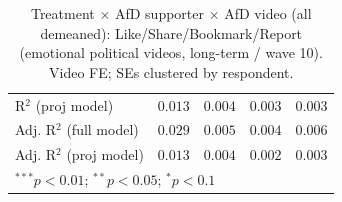\begin{table}
\begin{center}
\begin{tabular}{l c c c c}
R$^2$ (proj model)                               & $0.013$       & $0.004$       & $0.003$        & $0.003$        \\
Adj. R$^2$ (full model)                          & $0.029$       & $0.005$       & $0.004$        & $0.006$        \\
Adj. R$^2$ (proj model)                          & $0.013$       & $0.004$       & $0.002$        & $0.003$        \\
\hline
\multicolumn{5}{l}{\scriptsize{$^{***}p<0.01$; $^{**}p<0.05$; $^{*}p<0.1$}}
\end{tabular}
\caption{Treatment × AfD supporter × AfD video (all demeaned): Like/Share/Bookmark/Report (emotional political videos, long-term / wave 10). Video FE; SEs clustered by respondent.}
\label{tab:afd_video_3way_demeaned_longterm}
\end{center}
\end{table}
